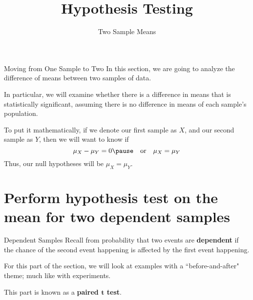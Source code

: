 \documentclass[t]{beamer}
\title{Hypothesis Testing}
\subtitle{Two Sample Means}
\author{}
\date{}
\begin{document}

\begin{frame} 
\maketitle
\end{frame}

\begin{frame}{Moving from One Sample to Two}
In this section, we are going to analyze the difference of means between two samples of data. \newline\\	\pause

In particular, we will examine whether there is a difference in means that is statistically significant, assuming there is no difference in means of each sample's population. \newline\\	\pause

To put it mathematically, if we denote our first sample as $X$, and our second sample as $Y$, then we will want to know if
\[\mu_X - \mu_Y = 0 \pause \quad \text{or} \quad \mu_X = \mu_Y\]
\pause
Thus, our null hypotheses will be $\mu_X = \mu_Y$.
\end{frame}

\section{Perform hypothesis test on the mean for two dependent samples}

\begin{frame}{Dependent Samples}
Recall from probability that two events are {\color{blue}\textbf{dependent}} if the chance of the second event happening is affected by the first event happening.	\newline\\	\pause

For this part of the section, we will look at examples with a ``before-and-after" theme; much like with experiments.	\newline\\	\pause

This part is known as a {\color{blue}\textbf{paired $\bm{t}$ test}}.
\end{frame}
\end{document}
